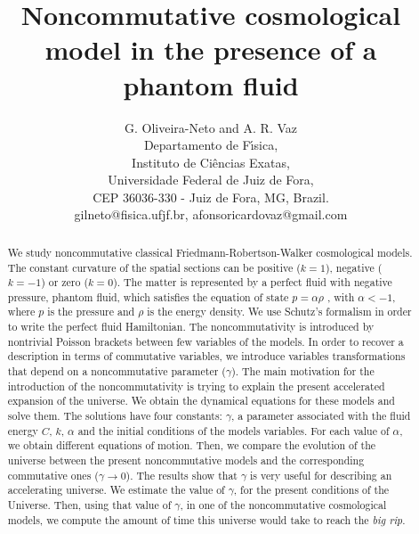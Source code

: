 \documentclass[12pt]{article}
\newcommand{\0}{{(0)}}
\newcommand{\1}{{(1)}}
\newcommand{\2}{{(2)}}
\begin{document}
\title{Noncommutative cosmological model in the presence of a phantom fluid}

\author{G. Oliveira-Neto and A. R. Vaz\\
Departamento de F\'{\i}sica, \\
Instituto de Ci\^{e}ncias Exatas, \\ 
Universidade Federal de Juiz de Fora,\\
CEP 36036-330 - Juiz de Fora, MG, Brazil.\\
gilneto@fisica.ufjf.br, afonsoricardovaz@gmail.com}

\maketitle

\begin{abstract}
We study noncommutative classical Friedmann-Robertson-Walker cosmological models. The constant 
curvature of the spatial sections can be positive ($k=1$), negative ($k=-1$) or zero ($k=0$). 
The matter is represented by a perfect fluid with negative pressure, phantom fluid, which 
satisfies the equation of state $p =\alpha \rho$ , with $\alpha < - 1$, where $p$ is the pressure 
and $\rho$ is the energy density. We use Schutz's formalism in order to write the perfect 
fluid Hamiltonian. The noncommutativity is introduced by nontrivial Poisson brackets
between few variables of the models. In order to recover a description in terms of commutative 
variables, we introduce variables transformations that depend on a noncommutative parameter ($\gamma$). 
The main motivation for the introduction of the noncommutativity is trying to explain the present 
accelerated expansion of the universe. We obtain the dynamical equations for these models and solve them.
The solutions have four constants: $\gamma$, a parameter associated with the fluid energy $C$, $k$, 
$\alpha$ and the initial conditions of the models variables. For each value of $\alpha$, we obtain 
different equations of motion. Then, we compare the evolution of the universe between the present 
noncommutative models and the corresponding commutative ones ($\gamma \to 0$). The results show that 
$\gamma$ is very useful for describing an accelerating universe. We estimate the value of $\gamma$, 
for the present conditions of the Universe. Then, using that value of $\gamma$, in one of the
noncommutative cosmological models, we compute the amount of time this universe would take to reach the {\it big rip}.
\end{abstract}
\end{document}
